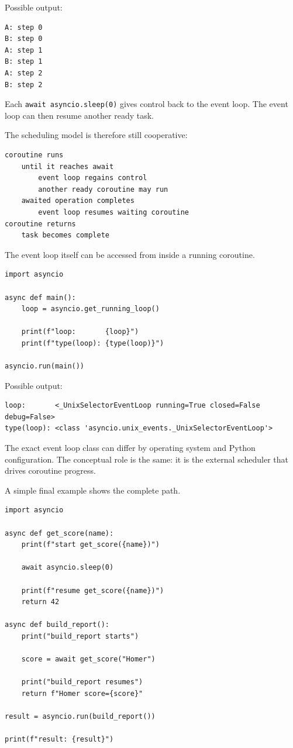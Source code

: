 Possible output:

\begin{verbatim}
A: step 0
B: step 0
A: step 1
B: step 1
A: step 2
B: step 2
\end{verbatim}

Each \texttt{await asyncio.sleep(0)} gives control back to the event loop. The event loop can then resume another ready task.

The scheduling model is therefore still cooperative:

\begin{verbatim}
coroutine runs
    until it reaches await
        event loop regains control
        another ready coroutine may run
    awaited operation completes
        event loop resumes waiting coroutine
coroutine returns
    task becomes complete
\end{verbatim}

The event loop itself can be accessed from inside a running coroutine.

\begin{verbatim}
import asyncio

async def main():
    loop = asyncio.get_running_loop()

    print(f"loop:       {loop}")
    print(f"type(loop): {type(loop)}")

asyncio.run(main())
\end{verbatim}

Possible output:

\begin{verbatim}
loop:       <_UnixSelectorEventLoop running=True closed=False debug=False>
type(loop): <class 'asyncio.unix_events._UnixSelectorEventLoop'>
\end{verbatim}

The exact event loop class can differ by operating system and Python configuration. The conceptual role is the same: it is the external scheduler that drives coroutine progress.

A simple final example shows the complete path.

\begin{verbatim}
import asyncio

async def get_score(name):
    print(f"start get_score({name})")

    await asyncio.sleep(0)

    print(f"resume get_score({name})")
    return 42

async def build_report():
    print("build_report starts")

    score = await get_score("Homer")

    print("build_report resumes")
    return f"Homer score={score}"

result = asyncio.run(build_report())

print(f"result: {result}")
\end{verbatim}


